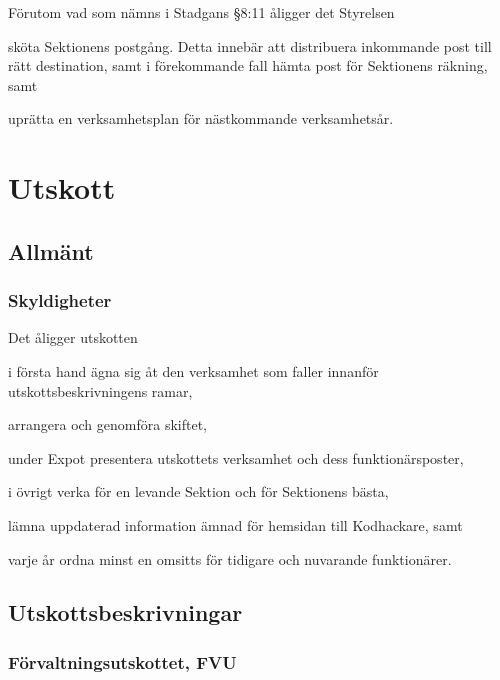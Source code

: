 \documentclass[10pt]{article}
\renewcommand{\thesubsection}{\arabic{section}:\Alph{subsection}}
\begin{document}
Förutom vad som nämns i Stadgans §8:11 åligger det Styrelsen
\begin{attlist}
    \item sköta Sektionens postgång. Detta innebär att distribuera inkommande
        post till rätt destination, samt i förekommande fall hämta post för
        Sektionens räkning, samt
    \item uprätta en verksamhetsplan för nästkommande verksamhetsår.
\end{attlist}

\renewcommand*\thesubsection{\arabic{section}:\arabic{subsection}}
\renewcommand*\thesubsubsection
{\arabic{section}:\arabic{subsection}:\Alph{subsubsection}}
\section{Utskott}

\subsection{Allmänt}

\subsubsection{Skyldigheter}

Det åligger utskotten
\begin{attlist}
    \item i första hand ägna sig åt den verksamhet som faller innanför
        utskottsbeskrivningens ramar,
    \item arrangera och genomföra skiftet,
    \item under Expot presentera utskottets verksamhet och dess
        funktionärsposter,
    \item i övrigt verka för en levande Sektion och för Sektionens bästa,
    \item lämna uppdaterad information ämnad för hemsidan till Kodhackare, samt
    \item varje år ordna minst en omsitts för tidigare och nuvarande
        funktionärer.
\end{attlist}
\subsection{Utskottsbeskrivningar}

\subsubsection{Förvaltningsutskottet, FVU}
\end{document}
